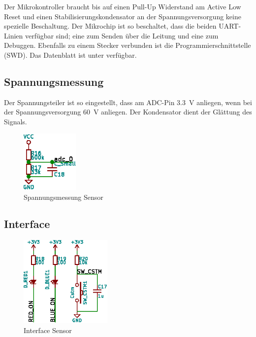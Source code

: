 Der  Mikrokontroller  braucht  bis  auf einen  Pull-Up  Widerstand  am  Active
Low  Reset und  einen  Stabilisierungskondensator  an der  Spannungsversorgung
keine  spezielle  Beschaltung. Der  Mikrochip  ist  so  beschaltet,  dass  die
beiden  UART-Linien  verf\"ugbar sind;  eine  zum  Senden \"uber  die  Leitung
und  eine  zum   Debuggen. Ebenfalls  zu  einem  Stecker   verbunden  ist  die
Programmierschnittstelle (SWD). Das Datenblatt  ist unter \cite{ref:atmel:cpu}
verf\"ugbar.



\clearpage
\subsection{Spannungsmessung}
\label{subsec:hw:sensor:voltageSense}

Der  Spannungsteiler  ist  so  eingestellt, dass  am  ADC-Pin  \SI{3.3}{\volt}
anliegen,  wenn  bei  der Spannungsversorgung  \SI{60}{\volt}  anliegen.   Der
Kondensator  dient der Gl\"attung des Signals.

\begin{figure}[h!t]
    \centering
    \includegraphics[width=0.25\textwidth]{images/sensor-sch/sensor--sch--sensor.eps}
    \caption[Sensor: Schema Spannungsmessung]{Spannungsmessung Sensor}
\end{figure}


\subsection{Interface}
\label{subsec:hw:sensor:interface}

\begin{figure}[h!t]
    \centering
    \includegraphics[angle=-90,width=0.4\textwidth]{images/sensor-sch/sensor--sch--interface.eps}
    \caption[Sensor: Schema Interface]{Interface Sensor}
\end{figure}

